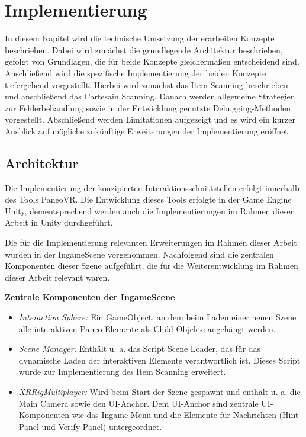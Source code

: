 \chapter{Implementierung}
\label{chap:Implementierung}


In diesem Kapitel wird die technische Umsetzung der erarbeiten Konzepte beschrieben. Dabei wird zunächst die grundlegende Architektur beschrieben, gefolgt von Grundlagen, die für beide Konzepte gleichermaßen entscheidend sind. Anschließend wird die spezifische Implementierung der beiden Konzepte tiefergehend vorgestellt. Hierbei wird zunächst das Item Scanning beschrieben und anschließend das Cartesain Scanning. Danach werden allgemeine Strategien zur Fehlerbehandlung sowie in der Entwicklung genutzte Debugging-Methoden vorgestellt. Abschließend werden Limitationen aufgezeigt und es wird ein kurzer Ausblick auf mögliche zukünftige Erweiterungen der Implementierung eröffnet. 

\section{Architektur}
Die Implementierung der konzipierten Interaktionsschnittstellen erfolgt innerhalb des Tools PaneoVR. Die Entwicklung dieses Tools erfolgte in der Game Engine Unity, dementsprechend werden auch die Implementierungen im Rahmen dieser Arbeit in Unity durchgeführt. 

Die für die Implementierung relevanten Erweiterungen im Rahmen dieser Arbeit wurden in der IngameScene vorgenommen. Nachfolgend sind die zentralen Komponenten dieser Szene aufgeführt, die für die Weiterentwicklung im Rahmen dieser Arbeit relevant waren. 

{\normalfont \bfseries Zentrale Komponenten der IngameScene}

\begin{itemize}
    \item \textit{Interaction Sphere:} Ein GameObject, an dem beim Laden einer neuen Szene alle interaktiven Paneo-Elemente als Child-Objekte angehängt werden.
    \item \textit{Scene Manager:} Enthält u. a. das Script Scene Loader, das für das dynamische Laden der interaktiven Elemente verantwortlich ist. Dieses Script wurde zur Implementierung des Item Scanning erweitert. 
    \item \textit{XRRigMultiplayer:} Wird beim Start der Szene gespawnt und enthält u. a. die Main Camera sowie den UI-Anchor. Dem UI-Anchor sind zentrale UI-Komponenten wie das Ingame-Menü und die Elemente für Nachrichten (Hint-Panel und Verify-Panel) untergeordnet.    
\end{itemize}

